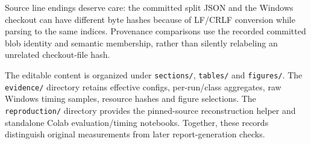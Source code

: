 Source line endings deserve care: the committed split JSON and the Windows
checkout can have different byte hashes because of LF/CRLF conversion while
parsing to the same indices. Provenance comparisons use the recorded committed
blob identity and semantic membership, rather than silently relabeling an
unrelated checkout-file hash.

The editable content is organized under \texttt{sections/}, \texttt{tables/}
and \texttt{figures/}. The \texttt{evidence/} directory retains effective
configs, per-run/class aggregates, raw Windows timing samples, resource hashes
and figure selections. The \texttt{reproduction/} directory provides the
pinned-source reconstruction helper and standalone Colab evaluation/timing
notebooks. Together, these records distinguish original measurements from
later report-generation checks.
